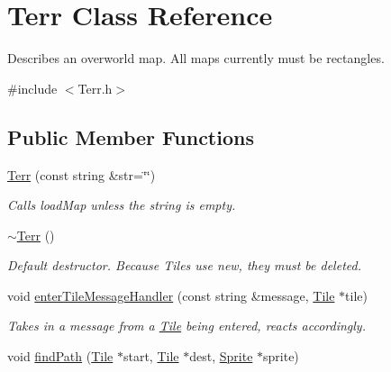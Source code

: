 \hypertarget{class_terr}{}\section{Terr Class Reference}
\label{class_terr}


Describes an overworld map. All maps currently must be rectangles.  




{\ttfamily \#include $<$Terr.\+h$>$}

\subsection*{Public Member Functions}
\begin{DoxyCompactItemize}
\item 
\hyperlink{class_terr_a947a7229cb37a0e87d340f6b88f46994}{Terr} (const string \&str=\char`\"{}\char`\"{})\hypertarget{class_terr_a947a7229cb37a0e87d340f6b88f46994}{}\label{class_terr_a947a7229cb37a0e87d340f6b88f46994}

\begin{DoxyCompactList}\small\item\em Calls load\+Map unless the string is empty. \end{DoxyCompactList}\item 
\hyperlink{class_terr_a8b68000bbfdc821e364bdb89f4465c17}{$\sim$\+Terr} ()\hypertarget{class_terr_a8b68000bbfdc821e364bdb89f4465c17}{}\label{class_terr_a8b68000bbfdc821e364bdb89f4465c17}

\begin{DoxyCompactList}\small\item\em Default destructor. Because Tiles use new, they must be deleted. \end{DoxyCompactList}\item 
void \hyperlink{class_terr_ad082e4ae9fa5527df4dbfca775a33945}{enter\+Tile\+Message\+Handler} (const string \&message, \hyperlink{class_tile}{Tile} $\ast$tile)\hypertarget{class_terr_ad082e4ae9fa5527df4dbfca775a33945}{}\label{class_terr_ad082e4ae9fa5527df4dbfca775a33945}

\begin{DoxyCompactList}\small\item\em Takes in a message from a \hyperlink{class_tile}{Tile} being entered, reacts accordingly. \end{DoxyCompactList}\item 
void \hyperlink{class_terr_ac7ae6f4b2857459afc5eac1ae83391c9}{find\+Path} (\hyperlink{class_tile}{Tile} $\ast$start, \hyperlink{class_tile}{Tile} $\ast$dest, \hyperlink{class_sprite}{Sprite} $\ast$sprite)\hypertarget{class_terr_ac7ae6f4b2857459afc5eac1ae83391c9}{}\label{class_terr_ac7ae6f4b2857459afc5eac1ae83391c9}


\end{DoxyCompactItemize}
